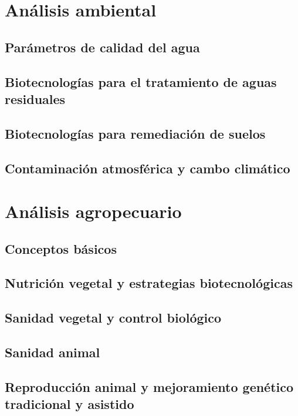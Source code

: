 \documentclass{../summarie}
\begin{document}
\part{Análisis ambiental}

    \chapter{Parámetros de calidad del agua}
    \chapter{Biotecnologías para el tratamiento de aguas residuales}
    \chapter{Biotecnologías para remediación de suelos}
    \chapter{Contaminación atmosférica y cambo climático}

\part{Análisis agropecuario}

    \chapter{Conceptos básicos}
    \chapter{Nutrición vegetal y estrategias biotecnológicas}
    \chapter{Sanidad vegetal y control biológico}
    \chapter{Sanidad animal}
    \chapter{Reproducción animal y mejoramiento genético tradicional y asistido}


\newpage


\end{document}
